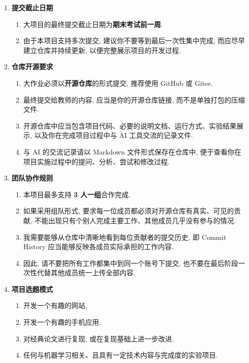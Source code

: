 \documentclass{../nndlcourse}
\begin{document}
\begin{enumerate}
	\item \textbf{提交截止日期}
	\begin{enumerate}
		\item 大项目的最终提交截止日期为\textbf{期末考试前一周}.
		\item 由于本项目支持多次提交, 建议你不要等到最后一次性集中完成, 而应尽早建立仓库并持续更新, 以便完整展示项目的开发过程.
	\end{enumerate}

	\item \textbf{仓库开源要求}
	\begin{enumerate}
		\item 大作业必须以\textbf{开源仓库}的形式提交, 推荐使用 GitHub 或 Gitee.
		\item 最终提交给教师的内容, 应当是你的开源仓库链接, 而不是单独打包的压缩文件.
		\item 开源仓库中应当包含项目代码、必要的说明文档、运行方式、实验结果展示, 以及你在完成项目过程中与 AI 工具交流的记录文件.
		\item 与 AI 的交流记录请以 Markdown 文件形式保存在仓库中, 便于查看你在项目实施过程中的提问、分析、尝试和修改过程.
	\end{enumerate}

	\item \textbf{团队协作规则}
	\begin{enumerate}
		\item 本项目最多支持 \textbf{3 人一组}合作完成.
		\item 如果采用组队形式, 要求每一位成员都必须对开源仓库有真实、可见的贡献, 不能出现只有个别人完成主要工作、其他成员几乎没有参与的情况.
		\item 我需要能够从仓库中清晰地看到每位贡献者的提交历史, 即 Commit History 应当能够反映各成员实际承担的工作内容.
		\item 因此, 请不要把所有工作都集中到同一个账号下提交, 也不要在最后阶段一次性代替其他成员统一上传全部内容.
	\end{enumerate}

	\item \textbf{项目选题模式}
	\begin{enumerate}
		\item 开发一个有趣的网站.
		\item 开发一个有趣的手机应用.
		\item 对经典论文进行复现, 或在复现基础上进一步改进.
		\item 任何与机器学习相关、且具有一定技术内容与完成度的实验项目.
	\end{enumerate}


\end{enumerate}
\end{document}
